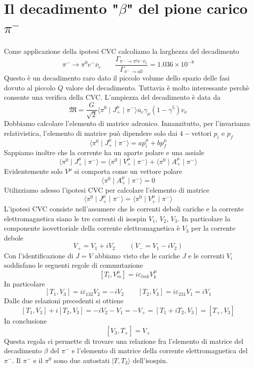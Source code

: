 \section{Il decadimento "$\beta$" del pione carico $\pi^-$}
Come applicazione della ipotesi CVC calcoliamo la larghezza del decadimento
$$
\pi^- \to \pi^0 e^- \overline{\nu}_e \quad \quad \frac{\Gamma_{\pi^- \to \pi^0 e^- \overline{\nu}_e}}{\Gamma_{\pi^- \to all}} = 1.036 \times 10^{-8}
$$
Questo è un decadimento raro dato il piccolo volume dello spazio delle fasi dovuto al piccolo $Q$ valore del decadimento. Tuttavia è molto interessante perchè consente una verifica della CVC. L'ampiezza del decadimento è data da
$$
\mathfrak{M} = \frac{G}{\sqrt{2}} \langle \pi^0 \mid J_+^\mu \mid \pi^- \rangle \overline{u}_e \gamma_\mu (1 - \gamma^5) v_\nu
$$
Dobbiamo calcolare l'elemento di matrice adronico. Innanzitutto, per l'invarianza relativistica, l'elemento di matrice può dipendere solo dai $4-$vettori $p_i$ e $p_f$
$$
\langle \pi^0 \mid J_+^\mu \mid \pi^- \rangle = a p_i^\mu + b p_f^\mu
$$
Sappiamo inoltre che la corrente ha un aparte polare e una assiale
$$
\langle \pi^0 \mid J_+^\mu \mid \pi^- \rangle = \langle \pi^0 \mid V_+^\mu \mid \pi^- \rangle + \langle \pi^0 \mid A_+^\mu \mid \pi^- \rangle
$$
Evidentemente solo $V^\mu$ si comporta come un vettore polare 
$$
\langle \pi^0 \mid A_+^\mu \mid \pi^- \rangle = 0
$$
Utilizziamo adesso l'ipotesi CVC per calcolare l'elemento di matrice
$$
\langle \pi^0 \mid J_+^\mu \mid \pi^- \rangle = \langle \pi^0 \mid V_+^\mu \mid \pi^- \rangle
$$
L'ipotesi CVC consiste nell'assumere che le correnti deboli cariche e la corrente elettromagnetica siano le tre correnti di isospin $V_1$, $V_2$, $V_3$. In particolare la componente isovettoriale della corrente elettromagnetica è $V_3$ per la corrente debole
$$
V_+ = V_1 + i V_2 \quad \quad (V_- = V_1 - i V_2)
$$
Con l'identificazione di $J=V$ abbiamo visto che le cariche $J$ e le correnti $V_i$ soddisfano le seguenti regole di commutazione
$$
[T_l, V_m^\mu] = i \varepsilon_{lmk} V_k^\mu
$$
In particolare
$$
[T_1, V_3] = i \varepsilon_{132} V_2 = -i V_2 \quad \quad [T_2, V_3] = i \varepsilon_{231} V_1 = i V_1
$$
Dalle due relazioni precedenti si ottiene
$$
[T_1, V_3] + i[T_2, V_3] = -iV_2 - V_1 = -V_+ = [T_1 + iT_2, V_3] = [T_+, V_3]
$$
In conclusione
$$
[V_3, T_+] = V_+
$$
Questa regola ci permette di trovare una relazione fra l'elemento di matrice del decadimento $\beta$ del $\pi^-$ e l'elemento di matrice della corrente elettromagnetica del $\pi^-$. Il $\pi^-$ e il $\pi^0$ sono due autostati $|T,T_3\rangle$ dell'isospin.
